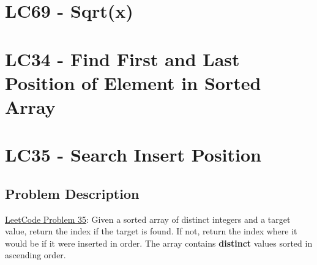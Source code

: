 \documentclass[justified]{tufte-book}
\begin{document}

\section{LC69 - Sqrt(x)}

\section{LC34 - Find First and Last Position of Element in Sorted Array} \label{sec:lc34_find_first_last_position_sorted_array}

\section{LC35 - Search Insert Position}
\subsection{Problem Description}
\href{https://leetcode.com/problems/search-insert-position/}{LeetCode Problem 35}: Given a sorted array of distinct integers and a target value, return the index if the target is found. If not, return the index where it would be if it were inserted in order. The array contains \textbf{distinct} values sorted in ascending order. 
\end{document}
